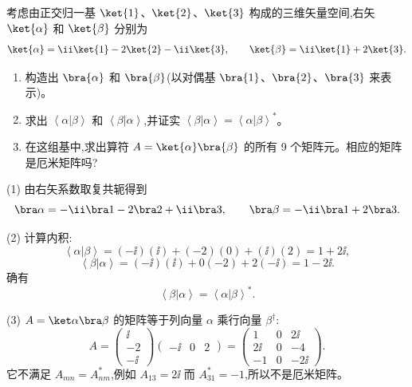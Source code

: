 \begin{question}
考虑由正交归一基 $\ket{1}$、$\ket{2}$、$\ket{3}$ 构成的三维矢量空间,右矢 $\ket{\alpha}$ 和 $\ket{\beta}$ 分别为
\[
\ket{\alpha}=\ii\ket{1}-2\ket{2}-\ii\ket{3},
\qquad
\ket{\beta}=\ii\ket{1}+2\ket{3}.
\]
\begin{enumerate}
\item 构造出 $\bra{\alpha}$ 和 $\bra{\beta}$(以对偶基 $\bra{1}$、$\bra{2}$、$\bra{3}$ 来表示)。
\item 求出 $\left\langle \alpha|\beta \right\rangle$ 和 $\left\langle \beta|\alpha \right\rangle$,并证实 $\left\langle \beta|\alpha \right\rangle=\left\langle \alpha|\beta \right\rangle^*$。
\item 在这组基中,求出算符 $A=\ket{\alpha}\bra{\beta}$ 的所有 9 个矩阵元。相应的矩阵是厄米矩阵吗?
\end{enumerate}
\end{question}
\begin{solution}
(1) 由右矢系数取复共轭得到
\[
\bra\alpha=-\ii\bra1-2\bra2+\ii\bra3,
\qquad
\bra\beta=-\ii\bra1+2\bra3.
\]

(2) 计算内积:
\[
\left\langle \alpha|\beta \right\rangle=(-\ii)(\ii)+(-2)(0)+(\ii)(2)=1+2\ii,
\]
\[
\left\langle \beta|\alpha \right\rangle=(-\ii)(\ii)+0(-2)+2(-\ii)=1-2\ii.
\]
确有
\[
\left\langle \beta|\alpha \right\rangle=\left\langle \alpha|\beta \right\rangle^*.
\]

(3) $A=\ket\alpha\bra\beta$ 的矩阵等于列向量 $\alpha$ 乘行向量 $\beta^\dagger$:
\[
A=\begin{pmatrix}\ii\\-2\\-\ii\end{pmatrix}
\begin{pmatrix}-\ii&0&2\end{pmatrix}
=\begin{pmatrix}
1&0&2\ii\\
2\ii&0&-4\\
-1&0&-2\ii
\end{pmatrix}.
\]
它不满足 $A_{mn}=A_{nm}^*$,例如 $A_{13}=2\ii$ 而 $A_{31}^*=-1$,所以不是厄米矩阵。
\end{solution}

